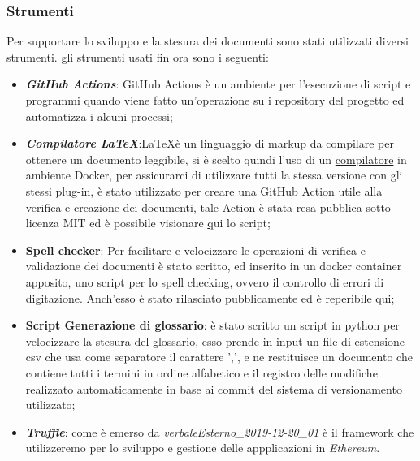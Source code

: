 \subsubsection{Strumenti}
Per supportare lo sviluppo e la stesura dei documenti sono stati utilizzati diversi
strumenti.
gli strumenti usati fin ora sono i seguenti:
\begin{itemize}
  \item \textbf{\textit{GitHub Actions\glos}}:
  GitHub Actions è un ambiente per l'esecuzione di script e programmi quando viene
  fatto un'operazione su i repository del progetto ed automatizza i alcuni processi;
  \item \textbf{\textit{Compilatore \LaTeX\glos}}:\LaTeX \space è un linguaggio
  di markup da compilare per ottenere un documento leggibile, si è scelto quindi l'uso di un
  \href{https://GitHub.com/dante-ev/docker-texlive}{compilatore} in ambiente Docker\glos,
  per assicurarci di utilizzare tutti la stessa versione con gli stessi plug-in,
  è stato utilizzato per creare una GitHub Action utile
  alla verifica e creazione dei documenti, tale Action è stata resa pubblica sotto licenza MIT
  ed è possibile visionare \href{https://GitHub.com/Jatus93/Latex-multicompiler}qui lo script;
  \item \textbf{Spell checker}:
  Per facilitare e velocizzare le operazioni di verifica e validazione dei documenti è
  stato scritto, ed inserito in un docker container apposito, uno script per lo
  spell checking, ovvero il controllo di errori di digitazione.
  Anch'esso è stato rilasciato pubblicamente ed è reperibile \href{https://GitHub.com/Jatus93/spellCheck}qui;

  \item \textbf{Script Generazione di glossario}: è stato scritto un script in python per velocizzare la stesura
  del glossario, esso prende in input un file di estensione csv che usa come
  separatore il carattere ',', e ne restituisce un documento che contiene tutti i
  termini in ordine alfabetico e il registro delle modifiche realizzato automaticamente
  in base ai commit del sistema di versionamento utilizzato;

  \item \textbf{\textit{Truffle\glos}}: come è emerso da \textit{verbaleEsterno\_2019-12-20\_01} è il framework che
  utilizzeremo per lo sviluppo e gestione delle appplicazioni in \textit{Ethereum\glos}.
\end{itemize}
